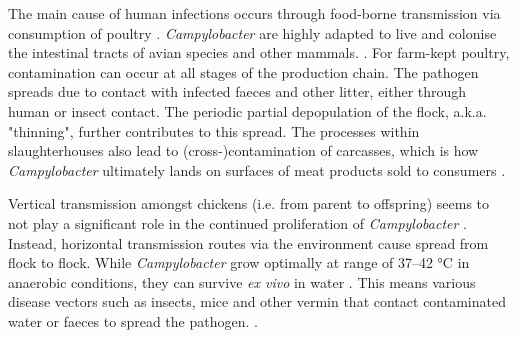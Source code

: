 

The main cause of human infections occurs through food-borne transmission via consumption of poultry \parencite{wilson_tracing_2008}. \textit{Campylobacter} are highly adapted to live and colonise the intestinal tracts of avian species and other mammals. \parencite{saif_diseases_2008}. For farm-kept poultry, contamination can occur at all stages of the production chain. The pathogen spreads due to contact with infected faeces and other litter, either through human or insect contact. The periodic partial depopulation of the flock, a.k.a. "thinning", further contributes to this spread. The processes within slaughterhouses also lead to (cross-)contamination of carcasses, which is how \textit{Campylobacter} ultimately lands on surfaces of meat products sold to consumers \parencite{skarp_campylobacteriosis_2015}.

Vertical transmission amongst chickens (i.e. from parent to offspring) seems to not play a significant role in the continued proliferation of \textit{Campylobacter} \parencite{callicott_lack_2006}. Instead, horizontal transmission routes via the environment cause spread from flock to flock. While \textit{Campylobacter} grow optimally at range of 37–42 °C in anaerobic conditions, they can survive \textit{ex vivo} in water \parencite{wilson_tracing_2008}. This means various disease vectors such as insects, mice and other vermin that contact contaminated water or faeces to spread the pathogen. \parencite{newell_sources_2003}.


